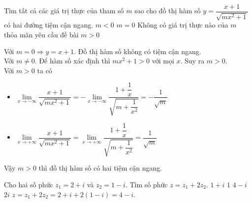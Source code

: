 \begin{ex}%
	Tìm tất cả các giá trị thực của tham số $m$ sao cho đồ thị hàm số $y=\dfrac{x+1}{\sqrt{mx^2+1}}$ có hai đường tiệm cận ngang. 	
	\choice
	{$m<0$}
	{$m=0$}
	{Không có giá trị thực nào của $m$ thỏa mãn yêu cầu đề bài}
	{\True $m>0$}
	\loigiai
	{
		Với $m=0\Rightarrow y=x+1$. Đồ thị hàm số không có tiệm cận ngang.\\
		Với $m\ne 0$. Để hàm số xác định thì $mx^2+1>0$ với mọi $x$. Suy ra $m> 0$.\\
		Với $m>0$ ta có
		\begin{itemize}
			\item $\lim\limits_{x\rightarrow -\infty}\dfrac{x+1}{\sqrt{mx^2+1}}=-\lim\limits_{x\rightarrow -\infty}\dfrac{1+\dfrac{1}{x}}{\sqrt{m+\dfrac{1}{x^2}}}=-\dfrac{1}{\sqrt{m}}$
			\item $\lim\limits_{x\rightarrow +\infty}\dfrac{x+1}{\sqrt{mx^2+1}}=\lim\limits_{x\rightarrow +\infty}\dfrac{1+\dfrac{1}{x}}{\sqrt{m+\dfrac{1}{x^2}}}=\dfrac{1}{\sqrt{m}}$
		\end{itemize}
		Vậy $m>0$ thì đồ thị hàm số có hai tiệm cận ngang.
	}
\end{ex} 

\begin{ex}%
	Cho hai số phức $z_1=2+i$ và $z_2=1-i$. Tìm số phức $z=z_1+2z_2$.
	\choice
	{$1+i$}
	{$1$}
	{\True $4-i$}
	{$2i$}
	\loigiai
	{
		$z=z_1+2z_2=2+i+2(1-i)=4-i.$
	}
\end{ex} 

